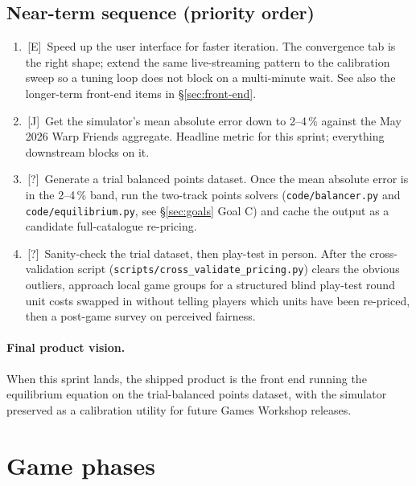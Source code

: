 \documentclass[11pt,a4paper]{article}
\newcommand{\eddie}{\textcolor{eddieblue}{\textsf{[E]}}}
\newcommand{\jake}{\textcolor{jakeorange}{\textsf{[J]}}}
\newcommand{\either}{\textcolor{eithergrey}{\textsf{[?]}}}
\newcommand{\todo}{\ding{109}\,}    %
\newcommand{\wip}{\ding{72}\,}      %
\begin{document}
\subsection*{Near-term sequence (priority order)}

\begin{enumerate}[itemsep=2pt]
  \item \todo \eddie\ Speed up the user interface for faster
    iteration. The convergence tab is the right shape; extend the
    same live-streaming pattern to the calibration sweep so a tuning
    loop does not block on a multi-minute wait. See also the
    longer-term front-end items in \S\ref{sec:front-end}.
  \item \wip \jake\ Get the simulator's mean absolute error down to
    2--4\,\% against the May 2026 Warp Friends aggregate. Headline
    metric for this sprint; everything downstream blocks on it.
  \item \todo \either\ Generate a trial balanced points dataset.
    Once the mean absolute error is in the 2--4\,\% band, run the
    two-track points solvers (\texttt{code/balancer.py} and
    \texttt{code/equilibrium.py}, see \S\ref{sec:goals} Goal C) and
    cache the output as a candidate full-catalogue re-pricing.
  \item \todo \either\ Sanity-check the trial dataset, then play-test
    in person. After the cross-validation script
    (\texttt{scripts/cross\_validate\_pricing.py}) clears the
    obvious outliers, approach local game groups for a structured
    blind play-test round \textemdash{} unit costs swapped in
    without telling players which units have been re-priced, then a
    post-game survey on perceived fairness.
\end{enumerate}

\paragraph{Final product vision.} When this sprint lands, the
shipped product is the front end running the equilibrium equation on
the trial-balanced points dataset, with the simulator preserved as a
calibration utility for future Games Workshop releases.

\section{Game phases}
\label{sec:phases}
\end{document}
